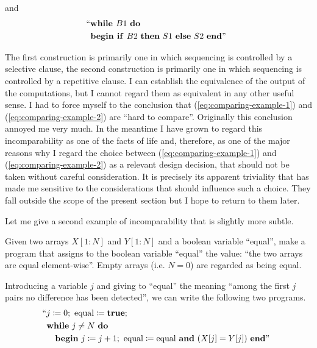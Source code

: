 \noindent
and
\begin{equation}
	\label{eq:comparing-example-2}
	\begin{split}
		&\text{\hspace{-.5em}``\textbf{while }} B1\text{ \textbf{do}}\\
		&\text{\textbf{begin if} } B2\text{ \textbf{then} } S1\text{ \textbf{else} } S2\text{ \textbf{end}''}
	\end{split}
\end{equation}

The first construction is primarily one in which sequencing is controlled by a selective clause, the second construction is primarily one in which sequencing is controlled by a repetitive clause. I can establish the equivalence of the output of the computations, but I cannot regard them as equivalent in any other useful sense. I had to force myself to the conclusion that (\ref{eq:comparing-example-1}) and (\ref{eq:comparing-example-2}) are ``hard to compare''. Originally this conclusion annoyed me very much. In the meantime I have grown to regard this incomparability as one of the facts of life and, therefore, as one of the major reasons why I regard the choice between (\ref{eq:comparing-example-1}) and (\ref{eq:comparing-example-2}) as a relevant design decision, that should not be taken without careful consideration. It is precisely its apparent triviality that has made me sensitive to the considerations that should influence such a choice. They fall outside the scope of the present section but I hope to return to them later.

Let me give a second example of incomparability that is slightly more subtle.

Given two arrays $X[1:N]$ and $Y[1:N]$ and a boolean variable ``equal'', make a program that assigns to the boolean variable ``equal'' the value: ``the two arrays are equal element-wise''. Empty arrays (i.e. $N = 0$) are regarded as being equal.

Introducing a variable $j$ and giving to ``equal'' the meaning ``among the first $j$ pairs no difference has been detected'', we can write the following two programs.
\begin{equation}
	\label{eq:comparing-example-3}
	\begin{split}
		&\text{\hspace{-.5em}``}j \coloneq 0;\text{ equal} \coloneq \text{\textbf{true}};\\
		&\text{\textbf{while} } j \neq N\text{ \textbf{do}}\\
		&\quad\text{\textbf{begin} } j \coloneq  j + 1;\text{ equal} \coloneq \text{equal \textbf{and} } (X[j] = Y[j]) \text{ \textbf{end}''}
	\end{split}
\end{equation}

